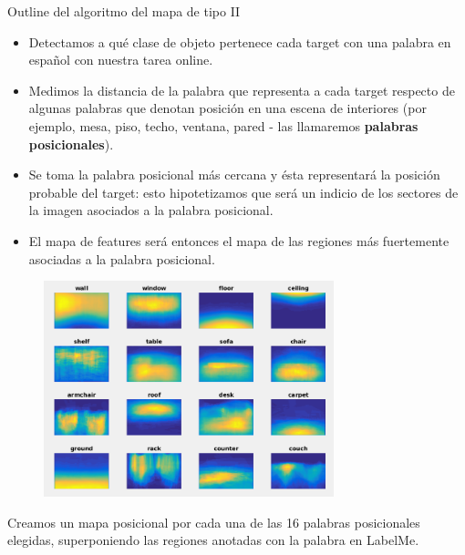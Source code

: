 \documentclass[compress]{beamer}
\begin{document}
\begin{frame}{Outline del algoritmo del mapa de tipo II}
\begin{itemize}
\item Detectamos a qué clase de objeto pertenece cada target con una palabra en español con nuestra tarea online.
\item Medimos la distancia de la palabra que representa a cada target respecto de algunas palabras que denotan posición en una escena de interiores (por ejemplo, mesa, piso, techo, ventana, pared
- las llamaremos \textbf{palabras posicionales}). 
\item Se toma la palabra posicional más cercana y ésta representará la posición probable del target: esto hipotetizamos que será un indicio de los sectores de la imagen asociados a la palabra posicional. 
\item El mapa de features será entonces el mapa de las regiones más fuertemente asociadas a la palabra posicional.
\end{itemize}
\end{frame}

\begin{frame}
\begin{figure}
\begin{center}
\includegraphics[width=0.75\textwidth]{images/labelme-global-features-without-horizon.png} 
\end{center}
\end{figure}

{\small Creamos un mapa posicional por cada una de las 16 palabras posicionales elegidas, superponiendo las regiones anotadas con la palabra en LabelMe.}
\end{frame}
\end{document}
